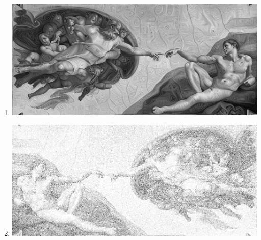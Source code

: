 \documentclass[man]{apa6}
\begin{document}
\begin{enumerate}
\begin{enumerate}
				\item \includegraphics[width=\textwidth]{plots/2/mirrorImgPS0Q2.png}
				\item \includegraphics[width=\textwidth]{plots/2/addNoiseImgPS0Q2.png}
		\end{enumerate}
		
	\end{enumerate}
\end{document}
